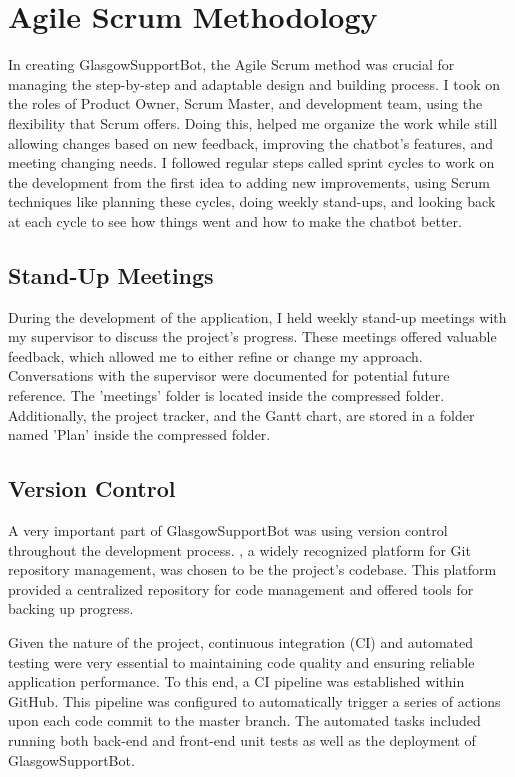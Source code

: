 \documentclass{l4proj}
\begin{document}
\section{Agile Scrum Methodology}


In creating GlasgowSupportBot, the Agile Scrum method was crucial for managing the step-by-step and adaptable design and building process. I took on the roles of Product Owner, Scrum Master, and development team, using the flexibility that Scrum offers. Doing this, helped me organize the work while still allowing changes based on new feedback, improving the chatbot's features, and meeting changing needs. I followed regular steps called sprint cycles to work on the development from the first idea to adding new improvements, using Scrum techniques like planning these cycles, doing weekly stand-ups, and looking back at each cycle to see how things went and how to make the chatbot better. 


\subsection{Stand-Up Meetings}

During the development of the application, I held weekly stand-up meetings with my supervisor to discuss the project's progress. These meetings offered valuable feedback, which allowed me to either refine or change my approach. Conversations with the supervisor were documented for potential future reference. The 'meetings' folder is located inside the compressed folder. Additionally, the project tracker, and the Gantt chart, are stored in a folder named 'Plan' inside the compressed folder.

\subsection{Version Control}

A very important part of GlasgowSupportBot was using version control throughout the development process. \cite{github}, a widely recognized platform for Git repository management, was chosen to be the project's codebase. This platform provided a centralized repository for code management and offered tools for backing up progress.

Given the nature of the project, continuous integration (CI) and automated testing were very essential to maintaining code quality and ensuring reliable application performance. To this end, a CI pipeline was established within GitHub. This pipeline was configured to automatically trigger a series of actions upon each code commit to the master branch. The automated tasks included running both back-end and front-end unit tests as well as the deployment of GlasgowSupportBot.
\end{document}
